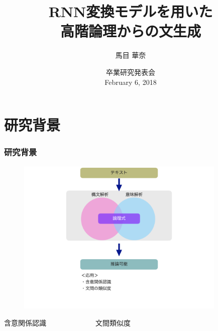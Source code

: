 \documentclass[dvipdfmx]{beamer}
\title{RNN変換モデルを用いた\\高階論理からの文生成}
\author[]{馬目 華奈}
\institute{戸次研究室}
\date{
卒業研究発表会\\
February 6, 2018}
\begin{document}
\begin{frame}
  \titlepage
\end{frame}


\section{研究背景}
\begin{frame}
\frametitle{研究背景}
\begin{center}
\begin{figure}[h]
	\includegraphics[width=10cm]{backend1.png}
        \label{fig:backend1}
\end{figure}
\vspace{-1zh}
\begin{center}
含意関係認識　　　　　　　文間類似度\\
\small{\citep{ccg2lambda}}　　\small{\cite{yanaka2017determining}}
\end{center}
\end{center}


\end{frame}
\end{document}
